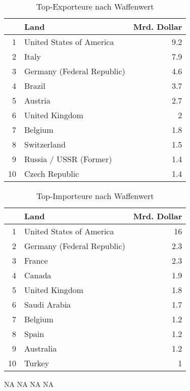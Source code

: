 \documentclass{article}
\begin{document}


\begin{table}[ht]
\centering
\begin{tabular}{rlr}
  \hline
 & Land & Mrd. Dollar \\ 
  \hline
1 & United States of America & 9.2 \\ 
  2 & Italy & 7.9 \\ 
  3 & Germany (Federal Republic) & 4.6 \\ 
  4 & Brazil & 3.7 \\ 
  5 & Austria & 2.7 \\ 
  6 & United Kingdom & 2 \\ 
  7 & Belgium & 1.8 \\ 
  8 & Switzerland & 1.5 \\ 
  9 & Russia / USSR (Former) & 1.4 \\ 
  10 & Czech Republic & 1.4 \\ 
   \hline
\end{tabular}
\caption{Top-Exporteure nach Waffenwert} 
\end{table}

\begin{table}[ht]
\centering
\begin{tabular}{rlr}
  \hline
 & Land & Mrd. Dollar\\ 
  \hline
1 & United States of America & 16\\ 
  2 & Germany (Federal Republic) & 2.3 \\ 
  3 & France & 2.3 \\ 
  4 & Canada & 1.9 \\ 
  5 & United Kingdom & 1.8 \\ 
  6 & Saudi Arabia & 1.7 \\ 
  7 & Belgium & 1.2 \\ 
  8 & Spain & 1.2 \\ 
  9 & Australia & 1.2 \\ 
  10 & Turkey & 1 \\ 
   \hline
\end{tabular}
\caption{Top-Importeure nach Waffenwert} 
\end{table}




\begin{itemize}
NA
NA
NA
NA
\end{itemize}
\end{document}
